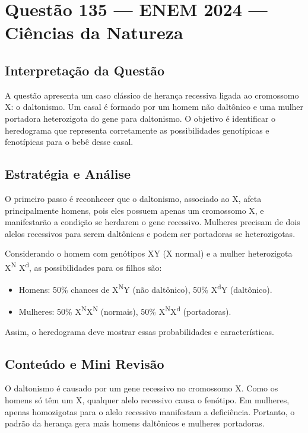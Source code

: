 \documentclass{article}
\begin{document}
\section*{Questão 135 — ENEM 2024 — Ciências da Natureza}

\subsection*{Interpretação da Questão}

A questão apresenta um caso clássico de herança recessiva ligada ao cromossomo X: o daltonismo. Um casal é formado por um homem não daltônico e uma mulher portadora heterozigota do gene para daltonismo. O objetivo é identificar o heredograma que representa corretamente as possibilidades genotípicas e fenotípicas para o bebê desse casal.

\subsection*{Estratégia e Análise}

O primeiro passo é reconhecer que o daltonismo, associado ao X, afeta principalmente homens, pois eles possuem apenas um cromossomo X, e manifestarão a condição se herdarem o gene recessivo. Mulheres precisam de dois alelos recessivos para serem daltônicas e podem ser portadoras se heterozigotas.

Considerando o homem com genótipos XY (X normal) e a mulher heterozigota X\textsuperscript{N} X\textsuperscript{d}, as possibilidades para os filhos são:

\begin{itemize}
  \item Homens: 50\% chances de X\textsuperscript{N}Y (não daltônico), 50\% X\textsuperscript{d}Y (daltônico).
  \item Mulheres: 50\% X\textsuperscript{N}X\textsuperscript{N} (normais), 50\% X\textsuperscript{N}X\textsuperscript{d} (portadoras).
\end{itemize}

Assim, o heredograma deve mostrar essas probabilidades e características.

\subsection*{Conteúdo e Mini Revisão}

O daltonismo é causado por um gene recessivo no cromossomo X. Como os homens só têm um X, qualquer alelo recessivo causa o fenótipo. Em mulheres, apenas homozigotas para o alelo recessivo manifestam a deficiência. Portanto, o padrão da herança gera mais homens daltônicos e mulheres portadoras.
\end{document}
